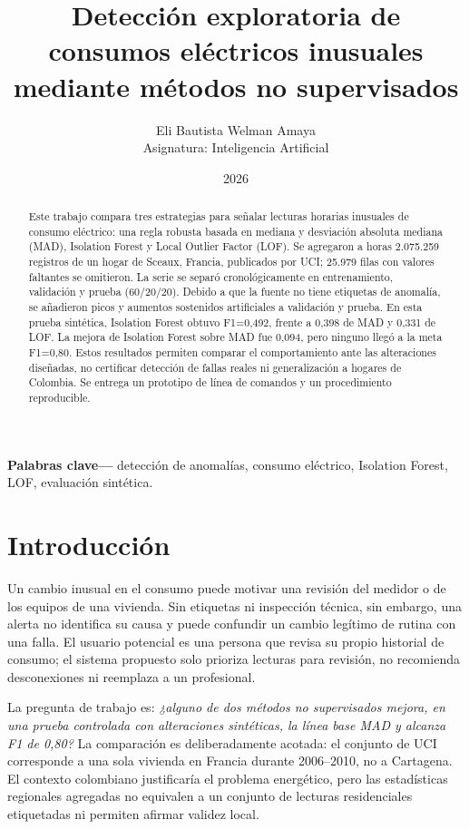 \documentclass[10pt,twocolumn]{article}
\title{Detección exploratoria de consumos eléctricos inusuales mediante métodos no supervisados}
\author{Eli Bautista Welman Amaya\\Asignatura: Inteligencia Artificial}
\date{2026}
\begin{document}
\maketitle
\begin{abstract}
Este trabajo compara tres estrategias para señalar lecturas horarias inusuales de consumo eléctrico: una regla robusta basada en mediana y desviación absoluta mediana (MAD), Isolation Forest y Local Outlier Factor (LOF). Se agregaron a horas 2.075.259 registros de un hogar de Sceaux, Francia, publicados por UCI; 25.979 filas con valores faltantes se omitieron. La serie se separó cronológicamente en entrenamiento, validación y prueba (60/20/20). Debido a que la fuente no tiene etiquetas de anomalía, se añadieron picos y aumentos sostenidos artificiales a validación y prueba. En esta prueba sintética, Isolation Forest obtuvo F1=0,492, frente a 0,398 de MAD y 0,331 de LOF. La mejora de Isolation Forest sobre MAD fue 0,094, pero ninguno llegó a la meta F1=0,80. Estos resultados permiten comparar el comportamiento ante las alteraciones diseñadas, no certificar detección de fallas reales ni generalización a hogares de Colombia. Se entrega un prototipo de línea de comandos y un procedimiento reproducible.
\end{abstract}
\noindent\textbf{Palabras clave—} detección de anomalías, consumo eléctrico, Isolation Forest, LOF, evaluación sintética.

\section{Introducción}
Un cambio inusual en el consumo puede motivar una revisión del medidor o de los equipos de una vivienda. Sin etiquetas ni inspección técnica, sin embargo, una alerta no identifica su causa y puede confundir un cambio legítimo de rutina con una falla. El usuario potencial es una persona que revisa su propio historial de consumo; el sistema propuesto solo prioriza lecturas para revisión, no recomienda desconexiones ni reemplaza a un profesional.

La pregunta de trabajo es: \emph{¿alguno de dos métodos no supervisados mejora, en una prueba controlada con alteraciones sintéticas, la línea base MAD y alcanza F1 de 0,80?} La comparación es deliberadamente acotada: el conjunto de UCI corresponde a una sola vivienda en Francia durante 2006–2010, no a Cartagena. El contexto colombiano justificaría el problema energético, pero las estadísticas regionales agregadas no equivalen a un conjunto de lecturas residenciales etiquetadas ni permiten afirmar validez local.
\end{document}

